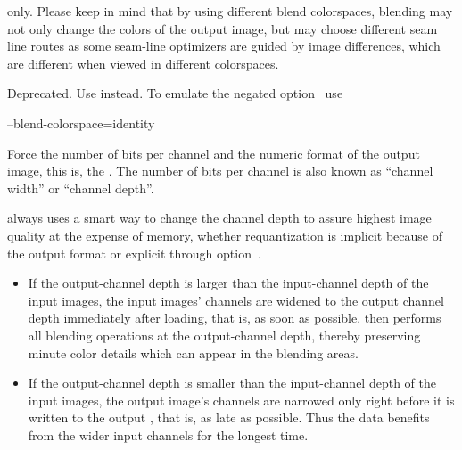 \begin{codelist}
  \ifenblend
    \begin{restrictedmaterial}{ only.}
      Please keep in mind that by using different blend colorspaces,
      blending may not only change the colors of the output image, but
       may choose different seam line routes as
      some seam-line optimizers are guided
      by image differences, which are different when viewed in
      different colorspaces.
    \end{restrictedmaterial}
  \fi


  \label{opt-ciecam}%
\item[\itempar{-c \\ --ciecam}]\itemend Deprecated.  Use
   instead.  To emulate the negated
  option~ use
  \begin{literal}
    --blend-colorspace=identity
  \end{literal}

  \label{opt:depth}%
\item[\itempar{-d \metavar{DEPTH} \\ --depth=\metavar{DEPTH}}]\itemend
  Force the number of bits per channel and
  the numeric format of the output image, this is, the
  .  The number of bits per channel is also known as
  ``channel width'' or ``channel
  depth''.

  \App{} always uses a smart way to change the channel depth to assure
  highest image quality at the expense of memory, whether
  requantization is implicit because of the
  output format or explicit through option~.

  \begin{itemize}
  \item
    If the output-channel depth is larger than the input-channel depth
    of the input images, the input images' channels are widened to the
    output channel depth immediately after loading, that is, as soon
    as possible.  \App{} then performs all blending operations at the
    output-channel depth, thereby preserving minute color details
    which can appear in the blending areas.

  \item
    If the output-channel depth is smaller than the input-channel
    depth of the input images, the output image's channels are
    narrowed only right before it is written to the output
    , that is, as late as possible.  Thus the data
    benefits from the wider input channels for the longest time.
  \end{itemize}


\end{codelist}
